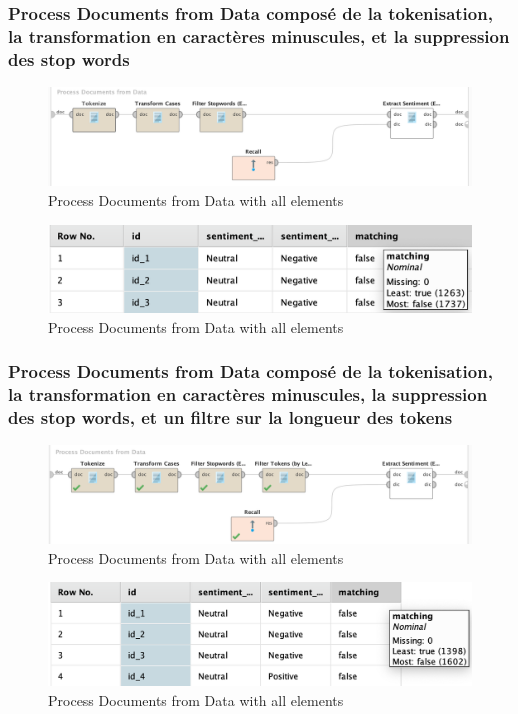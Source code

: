 \documentclass[a4paper]{article}
\begin{document}
\subsubsection{Process Documents from Data composé de la tokenisation, la transformation en caractères minuscules, et la suppression des stop words}
\begin{figure}[H]
	\includegraphics[width=\linewidth]{imgs/part_3/3_processing_documents_no_stem_filter_token}
	\caption{Process Documents from Data with all elements}
	\label{fig:3_processing_documents_full}
\end{figure}
\begin{figure}[H]
	\includegraphics[width=\linewidth]{imgs/part_3/3_processing_documents_no_stem_filter_token_results}
	\caption{Process Documents from Data with all elements}
	\label{fig:3_processing_documents_full}
\end{figure}



\subsubsection{Process Documents from Data composé de la tokenisation, la transformation en caractères minuscules, la suppression des stop words, et un filtre sur la longueur des tokens}
\begin{figure}[H]
	\includegraphics[width=\linewidth]{imgs/part_3/3_processing_documents_no_stem}
	\caption{Process Documents from Data with all elements}
	\label{fig:3_processing_documents_full}
\end{figure}
\begin{figure}[H]
	\includegraphics[width=\linewidth]{imgs/part_3/3_processing_documents_no_stem_results}
	\caption{Process Documents from Data with all elements}
	\label{fig:3_processing_documents_full}
\end{figure}
\end{document}
